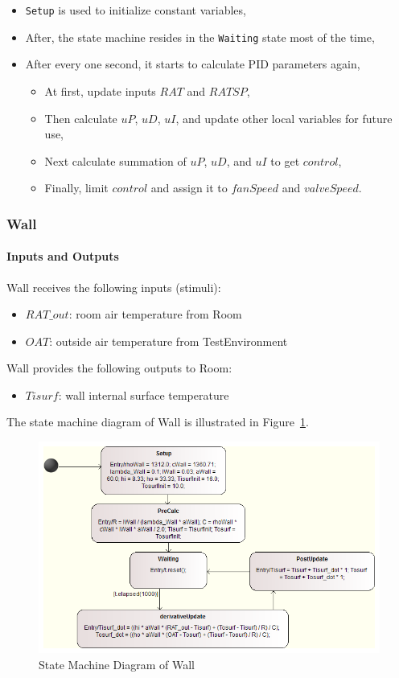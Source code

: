 \begin{itemize}
    \item \verb+Setup+ is used to initialize constant variables,
    \item After, the state machine resides in the \verb+Waiting+ state most of the time,
    \item After every one second, it starts to calculate PID parameters again,
        \begin{itemize}
            \item At first, update inputs $RAT$ and $RATSP$,
            \item Then calculate $uP$, $uD$, $uI$, and update other local variables for future use,
            \item Next calculate summation of $uP$, $uD$, and $uI$ to get $control$,
            \item Finally, limit $control$ and assign it to $fanSpeed$ and $valveSpeed$.
        \end{itemize}
\end{itemize}

\subsubsection{Wall}
\paragraph{Inputs and Outputs}
Wall receives the following inputs (stimuli):
\begin{itemize}
    \item $RAT\_out$: room air temperature from Room 
    \item $OAT$: outside air temperature from TestEnvironment 
\end{itemize}

Wall provides the following outputs to Room:
\begin{itemize}
	\item $Tisurf$: wall internal surface temperature
\end{itemize}

The state machine diagram of Wall is illustrated in Figure~\ref{fig:fcu_sut_wall_sm}.
\begin{figure}[htb!]
    \centering
	\includegraphics[width=1.0\textwidth]{roomwall/fcu_sut_wall_sm}
    \caption{State Machine Diagram of Wall}
    \label{fig:fcu_sut_wall_sm}
\end{figure}

